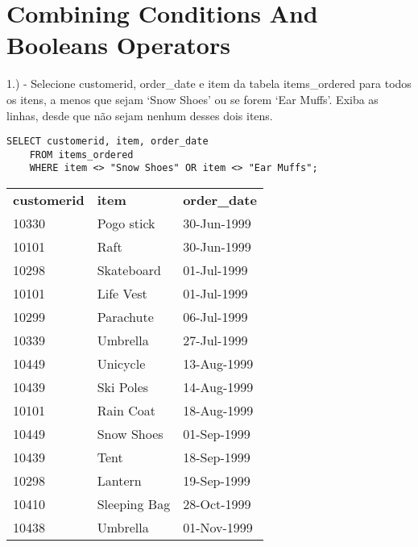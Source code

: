 \section{Combining Conditions And Booleans Operators}

1.) - Selecione customerid, order\_date e item da tabela items\_ordered para todos os itens, a menos que sejam ‘Snow Shoes’ ou se forem ‘Ear Muffs’. Exiba as linhas, desde que não sejam nenhum desses dois itens.

\begin{lstlisting}
SELECT customerid, item, order_date
	FROM items_ordered
	WHERE item <> "Snow Shoes" OR item <> "Ear Muffs";
\end{lstlisting}

\begin{tabular}{lll}
    {\textbf{customerid}} & {\textbf{item}}       & {\textbf{order\_date}} \\
    {10330}               & {Pogo stick}          & {30-Jun-1999}          \\
    {10101}               & {Raft}                & {30-Jun-1999}          \\
    {10298}               & {Skateboard}          & {01-Jul-1999}          \\
    {10101}               & {Life Vest}           & {01-Jul-1999}          \\
    {10299}               & {Parachute}           & {06-Jul-1999}          \\
    {10339}               & {Umbrella}            & {27-Jul-1999}          \\
    {10449}               & {Unicycle}            & {13-Aug-1999}          \\
    {10439}               & {Ski Poles}           & {14-Aug-1999}          \\
    {10101}               & {Rain Coat}           & {18-Aug-1999}          \\
    {10449}               & {Snow Shoes}          & {01-Sep-1999}          \\
    {10439}               & {Tent}                & {18-Sep-1999}          \\
    {10298}               & {Lantern}             & {19-Sep-1999}          \\
    {10410}               & {Sleeping Bag}        & {28-Oct-1999}          \\
    {10438}               & {Umbrella}            & {01-Nov-1999}          \\

\end{tabular}
